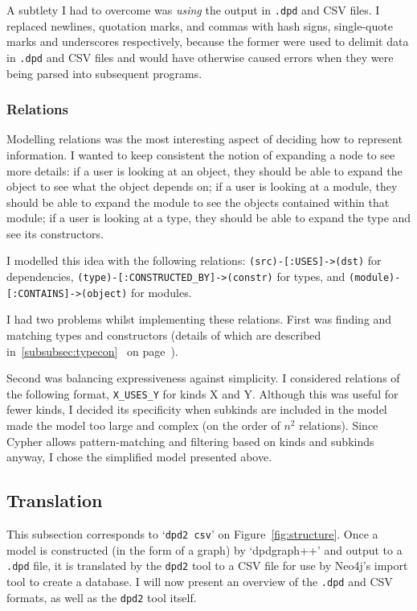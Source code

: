 A subtlety I had to overcome was \emph{using} the output in \texttt{.dpd} and
CSV files. I replaced newlines, quotation marks, and commas with hash signs,
single-quote marks and underscores respectively, because the former were used to
delimit data in \texttt{.dpd} and CSV files and would have otherwise caused
errors when they were being parsed into subsequent programs.

\subsubsection{Relations}

Modelling relations was the most interesting aspect of deciding how to
represent information. I wanted to keep consistent the notion of expanding a
node to see more details: if a user is looking at an object, they should be able
to expand the object to see what the object depends on; if a user is looking at
a module, they should be able to expand the module to see the objects contained
within that module; if a user is looking at a type, they should
be able to expand the type and see its constructors.

I modelled this idea with the following relations:
\texttt{(src)-[:USES]->(dst)} for dependencies,
\texttt{(type)-[:CONSTRUCTED_BY]->(constr)} for types, and
\texttt{(module)-[:CONTAINS]->(object)} for modules.

I had two problems whilst implementing these relations. First was finding
and matching types and constructors (details of which are described
in~\ref{subsubsec:typecon}~ on
page~\pageref{subsubsec:typecon}).

Second was balancing expressiveness against simplicity. I considered
relations of the following format, \texttt{X\_USES\_Y} for kinds X and Y.
Although this was useful for fewer kinds, I decided its specificity when
subkinds are included in the model made the model too large and complex (on the
order of $n^{2}$ relations). Since Cypher allows pattern-matching and
filtering based on kinds and subkinds anyway, I chose the simplified model
presented above.

\subsection{Translation}\label{subsec:translation}

This subsection corresponds to `\texttt{dpd2 csv}' on
Figure~\ref{fig:structure}.  Once a model is constructed (in the form of a
graph) by `dpdgraph++' and output to a \texttt{.dpd} file, it is translated by
the \texttt{dpd2} tool to a CSV file for use by Neo4j's import tool to create a
database. I will now present an overview of the \texttt{.dpd} and CSV formats,
as well as the \texttt{dpd2} tool itself.

